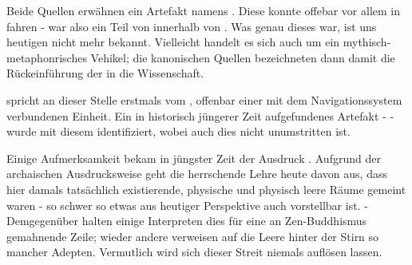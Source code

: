 Beide Quellen erwähnen ein Artefakt namens . Diese  konnte offebar vor allem in  fahren - war also ein Teil von  innerhalb von . Was genau dieses war, ist uns heutigen nicht mehr bekannt. Vielleicht handelt es sich auch um ein mythisch-metaphonrisches Vehikel; die kanonischen Quellen bezeichneten dann damit die Rückeinführung der  in die Wissenschaft. 

 spricht an dieser Stelle erstmals vom , offenbar einer mit dem Navigationssystem verbundenen Einheit. Ein in historisch  jüngerer Zeit aufgefundenes Artefakt -  - wurde mit diesem  identifiziert, wobei auch dies nicht unumstritten ist.

Einige Aufmerksamkeit bekam in jüngster Zeit der Ausdruck . Aufgrund der archaischen Ausdrucksweise geht die herrschende Lehre heute davon aus, dass hier damals tatsächlich existierende, physische und physisch leere Räume gemeint waren - so schwer so etwas aus heutiger Perspektive auch vorstellbar ist. - Demgegenüber halten einige Interpreten dies für eine an Zen-Buddhismus gemahnende Zeile; wieder andere verweisen auf die Leere hinter der Stirn so mancher Adepten. Vermutlich wird sich dieser Streit niemals auflösen lassen.

